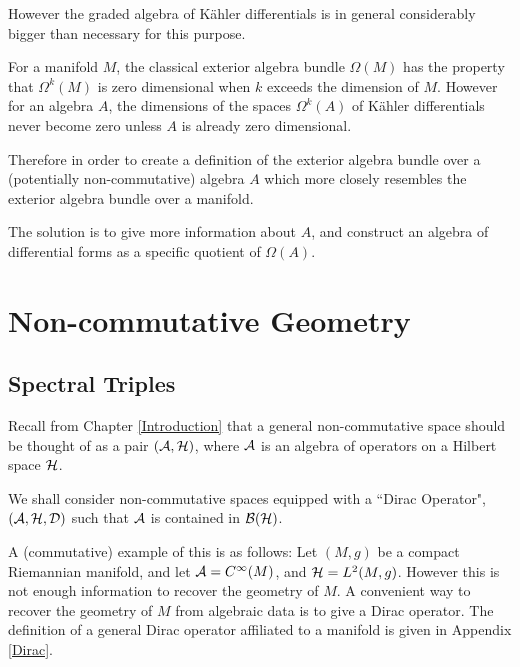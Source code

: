 However the graded algebra of K\"ahler differentials
is in general considerably bigger than necessary for this purpose. 

For a manifold $M$, the classical exterior algebra
bundle $\Omega(M)$ has the property that $\Omega^k(M)$
is zero dimensional when $k$ exceeds the dimension of $M$. However 
for an algebra $A$, the dimensions of the spaces $\Omega^k(A)$
of K\"ahler differentials never become zero unless $A$
is already zero dimensional. 

Therefore in order to create a definition of the exterior
algebra bundle over a (potentially non-commutative) algebra $A$ which
more closely resembles the exterior algebra bundle over a manifold.

The solution is to give more information about $A$, and construct
an algebra of differential forms as a specific quotient of $\Omega(A)$.




\section{Non-commutative Geometry}
\subsection{Spectral Triples}
Recall from Chapter \ref{Introduction} that a general non-commutative
space should be thought of as a pair $(\mathcal{A},\mathcal{H})$, where $\mathcal{A}$
is an algebra of operators on a Hilbert space $\mathcal{H}$. 


We shall consider non-commutative spaces equipped with a ``Dirac Operator", $(\mathcal{A},\mathcal{H},\mathcal{D})$
such that $\mathcal{A}$ is contained in $\mathcal{B}(\mathcal{H})$.

A (commutative) example of this is as follows: Let $(M,g)$ be a compact Riemannian manifold,
and let $\mathcal{A} = C^\infty(M)$, and $\mathcal{H} = L^2(M,g)$. However
this is not enough information to recover the geometry of $M$. A convenient
way to recover the geometry of $M$ from algebraic data is to give a Dirac operator.
The definition of a general Dirac operator affiliated
to a manifold is given in Appendix \ref{Dirac}. 


